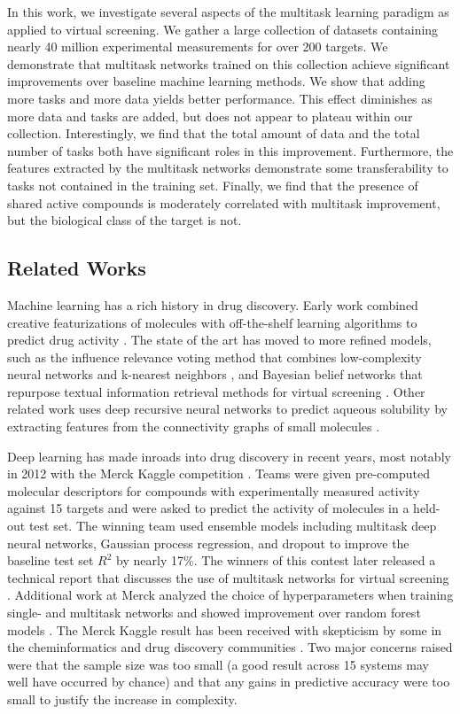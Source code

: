 In this work, we investigate several aspects of the multitask learning
paradigm as applied to virtual screening. We gather a large collection of
datasets containing nearly 40 million experimental measurements for over
200 targets. We demonstrate that multitask networks trained on this
collection achieve significant improvements over baseline machine learning
methods. We show that adding more tasks and more data yields better
performance. This effect diminishes as more data and tasks are added, but
does not appear to plateau within our collection. Interestingly, we find
that the total amount of data and the total number of tasks both have
significant roles in this improvement. Furthermore, the features extracted
by the multitask networks demonstrate some transferability to tasks not
contained in the training set. Finally, we find that the presence of shared
active compounds is moderately correlated with multitask improvement, but
the biological class of the target is not.

\subsection{Related Works}

Machine learning has a rich history in drug discovery. Early work combined
creative featurizations of molecules with off-the-shelf learning algorithms
to predict drug activity \cite{varnek2012machine}. The state of the art has
moved to more refined models, such as the influence relevance voting method
that combines low-complexity neural networks and k-nearest neighbors
\cite{swamidass2009influence}, and Bayesian belief networks that repurpose
textual information retrieval methods for virtual screening
\cite{abdo2010ligand}. Other related work uses deep recursive neural
networks to predict aqueous solubility by extracting features from the
connectivity graphs of small molecules \cite{lusci2013deep}.

Deep learning has made inroads into drug discovery in recent years, most
notably in 2012 with the Merck Kaggle competition \cite{dahl2012deep}.
Teams were given pre-computed molecular descriptors for compounds with
experimentally measured activity against 15 targets and were asked to
predict the activity of molecules in a held-out test set. The winning team
used ensemble models including multitask deep neural networks, Gaussian
process regression, and dropout to improve the baseline test set $R^2$ by
nearly 17\%. The winners of this contest later released a technical report
that discusses the use of multitask networks for virtual screening
\cite{dahl2014multi}. Additional work at Merck analyzed the choice of
hyperparameters when training single- and multitask networks and showed
improvement over random forest models \cite{ma2015deep}. The Merck Kaggle
result has been received with skepticism by some in the cheminformatics and
drug discovery communities \citep[and associated comments]{lowe2012did}.
Two major concerns raised were that the sample size was too small (a good
result across 15 systems may well have occurred by chance) and that any
gains in predictive accuracy were too small to justify the increase in
complexity.

